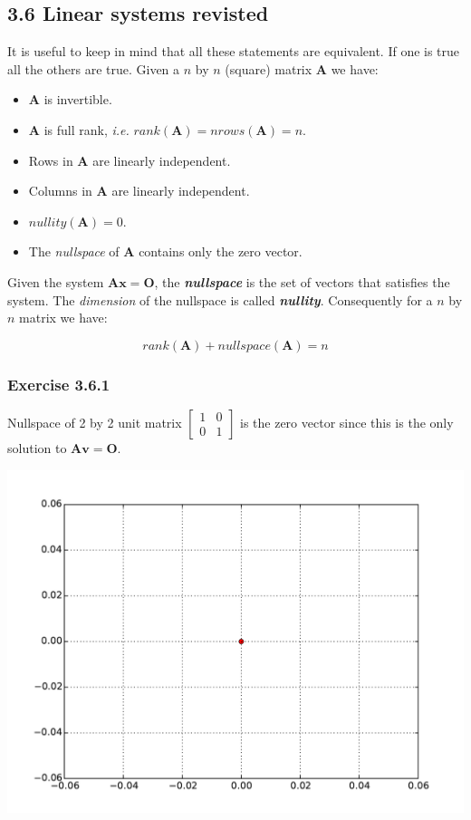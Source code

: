\subsection{3.6 Linear systems revisted}

It is useful to keep in mind that all these statements are equivalent. If one is
true all the others are true. Given a $n$ by $n$ (square) matrix \textbf{A} we have:

\begin{itemize}
\item \textbf{A} is invertible.
\item \textbf{A} is full rank, \emph{i.e.} $rank(\mathbf{A}) = nrows(\mathbf{A}) = n$.
\item Rows in \textbf{A} are linearly independent.
\item Columns in \textbf{A} are linearly independent.
\item $nullity(\mathbf{A}) = 0$.
\item The \emph{nullspace} of \textbf{A} contains only the zero vector.
\end{itemize}

Given the system $\mathbf{Ax = O}$, the \textbf{\emph{nullspace}} is the set of
vectors that satisfies the system. The \emph{dimension} of the nullspace is called
\textbf{\emph{nullity}}. Consequently for a $n$ by $n$ matrix we have:

$$
rank(\mathbf{A}) + nullspace(\mathbf{A}) = n
$$

\subsubsection{Exercise 3.6.1}

Nullspace of 2 by 2 unit matrix $\left[\begin{matrix}1 & 0\\0 & 1\end{matrix}\right]$
is the zero vector since this is the only solution to $\mathbf{Av = O}$.

\includegraphics[width=0.7\linewidth]{figs/ex3_6_1.pdf}

